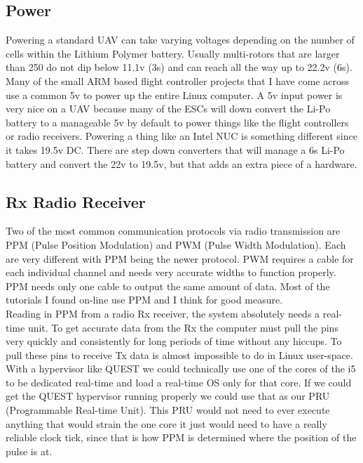 \documentclass[letterpaper,10pt,notitlepage,fleqn]{article}
\begin{document}
\subsection{Power}
\indent Powering a standard UAV can take varying voltages depending on the number of cells within the Lithium Polymer battery. Usually multi-rotors that are larger than 250 do not dip below 11.1v (3s) and can reach all the way up to 22.2v (6s). Many of the small ARM based flight controller projects that I have come across use a common 5v to power up the entire Linux computer. A 5v input power is very nice on a UAV because many of the ESCs will down convert the Li-Po battery to a
manageable 5v by default to power things like the flight controllers or radio receivers. Powering a thing like an Intel NUC is something different since it takes 19.5v DC. There are step down converters that will manage a 6s Li-Po battery and convert the 22v to 19.5v, but that adds an extra piece of a hardware. 

\subsection{Rx Radio Receiver}
\indent Two of the most common communication protocols via radio transmission are PPM (Pulse Position Modulation) and PWM (Pulse Width Modulation). Each are very different with PPM being the newer protocol. PWM requires a cable for each individual channel and needs very accurate widths to function properly. PPM needs only one cable to output the same amount of data. Most of the tutorials I found on-line use PPM and I think for good measure. 
\\
\indent Reading in PPM from a radio Rx receiver, the system absolutely needs a real-time unit. To get accurate data from the Rx the computer must pull the pins very quickly and consistently for long periods of time without any hiccups. To pull these pins to receive Tx data is almost impossible to do in Linux user-space. With a hypervisor like QUEST we could technically use one of the cores of the i5 to be dedicated real-time and load a real-time OS only for that core. If we could get the
QUEST hypervisor running properly we could use that as our PRU (Programmable Real-time Unit). This PRU would not need to ever execute anything that would strain the one core it just would need to have a really reliable clock tick, since that is how PPM is determined where the position of the pulse is at. 
\end{document}
